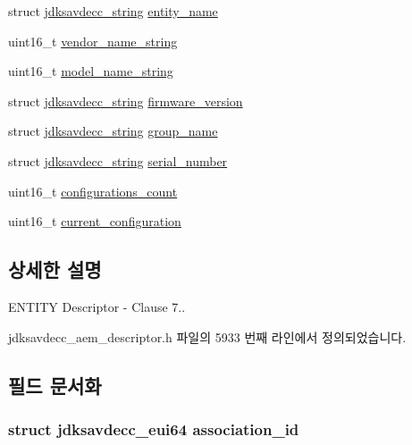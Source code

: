 \begin{DoxyCompactItemize}
\item 
struct \hyperlink{structjdksavdecc__string}{jdksavdecc\+\_\+string} \hyperlink{structjdksavdecc__descriptor__entity_a4aea558819a980a1e6ab23e3fef33151}{entity\+\_\+name}
\item 
uint16\+\_\+t \hyperlink{structjdksavdecc__descriptor__entity_a549d6f7287556a7baa0df2a68065e602}{vendor\+\_\+name\+\_\+string}
\item 
uint16\+\_\+t \hyperlink{structjdksavdecc__descriptor__entity_a1c25086c94b5d1fd63d77b5eaa4ccd74}{model\+\_\+name\+\_\+string}
\item 
struct \hyperlink{structjdksavdecc__string}{jdksavdecc\+\_\+string} \hyperlink{structjdksavdecc__descriptor__entity_a31689a4dc44469797d55d47ac09c66fc}{firmware\+\_\+version}
\item 
struct \hyperlink{structjdksavdecc__string}{jdksavdecc\+\_\+string} \hyperlink{structjdksavdecc__descriptor__entity_aec617f41572a72825fc2cc6a4a150c59}{group\+\_\+name}
\item 
struct \hyperlink{structjdksavdecc__string}{jdksavdecc\+\_\+string} \hyperlink{structjdksavdecc__descriptor__entity_a3cf7494988985903d75b67aef67976d5}{serial\+\_\+number}
\item 
uint16\+\_\+t \hyperlink{structjdksavdecc__descriptor__entity_acd98c5a873e9714692b16260d1e9ea0f}{configurations\+\_\+count}
\item 
uint16\+\_\+t \hyperlink{structjdksavdecc__descriptor__entity_acbe7b9cc1c5e0e0f5f18fd0552641649}{current\+\_\+configuration}
\end{DoxyCompactItemize}


\subsection{상세한 설명}
E\+N\+T\+I\+TY Descriptor -\/ Clause 7.. 

jdksavdecc\+\_\+aem\+\_\+descriptor.\+h 파일의 5933 번째 라인에서 정의되었습니다.



\subsection{필드 문서화}
\subsubsection[{\texorpdfstring{association\+\_\+id}{association_id}}]{\setlength{\rightskip}{0pt plus 5cm}struct {\bf jdksavdecc\+\_\+eui64} association\+\_\+id}\hypertarget{structjdksavdecc__descriptor__entity_a0fa49c5118429af7a5ee7d71eada7b94}{}\label{structjdksavdecc__descriptor__entity_a0fa49c5118429af7a5ee7d71eada7b94}


